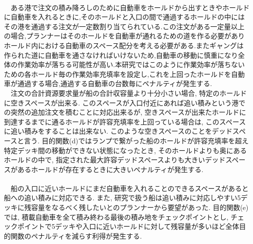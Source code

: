 \documentclass[a4j,11pt,twocolumn]{jsarticle}
\begin{document}
 \\
　ある港で注文の積み降ろしのために自動車をホールドから出すときやホールドに自動車を入れるときに,そのホールドと入口の間で通過するホールドの中にはその港を通過する注文が一定数割り当てられている.この注文がある一定量以上の場合,プランナーはそのホールドを自動車が通れるための道を作る必要がありホールド内における自動車のスペース配分を考える必要がある.またギャングは作られた道に自動車を通さなければいけないため,自動車の移動に慎重になり全体の作業効率が落ちる可能性が高い.本研究ではこのように作業効率が落ちないための各ホールド毎の作業効率充填率を設定し,これを上回ったホールドを自動車が通過する場合,通過する自動車の台数毎にペナルティが発生する.
 \\
　注文の合計資源要求量が船の合計収容量より十分小さい場合, 特定のホールドに空きスペースが出来る. このスペースが入口付近にあれば追い積みという港での突然の追加注文を積むことに対応出来るが, 空きスペースが出来たホールドに到達するまでに通るホールドが許容充填率を上回っている場合は, このスペースに追い積みをすることは出来ない. このような空きスペースのことをデッドスペースと言う. 目的関数(d)ではランプで繋がった船のホールドが許容充填率を超え特定デッキ間の移動ができない状態になったとき, そのホールドよりも奥にあるホールドの中で, 指定された最大許容デッドスペースよりも大きいデッドスペースがあるホールドが存在するときに大きいペナルティが発生する. \\

 \\
　船の入口に近いホールドにまだ自動車を入れることのできるスペースがあると船への追い積みに対応できる. また, 研究で扱う船は追い積みに対応しやすい5デッキに残容量をなるべく残したいとのプランナーから要望があった. 目的関数(e)では, 積載自動車を全て積み終わる最後の積み地をチェックポイントとし, チェックポイントで5デッキや入口に近いホールドに対して残容量が多いほど全体目的関数のペナルティを減らす利得が発生する. \\

\end{document}
